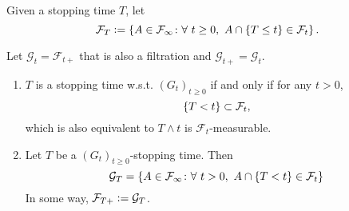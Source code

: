 \begin{defn}
    Given a stopping time $T$, let
    \begin{equation*}
        \mathcal{F}_T \vcentcolon= \left\{A \in \mathcal{F}_\infty \colon \forall~t \geq 0,~ A \cap \left\{T \leq t\right\} \in \mathcal{F}_t\right\}.
    \end{equation*}
\end{defn}

\noindent Let $\mathcal{G}_t = \mathcal{F}_{t+}$ that is also a filtration and $\mathcal{G}_{t+} = \mathcal{G}_t$.
\begin{prop}
    \begin{enumerate}[label=(\arabic{*})]
        \item $T$ is a stopping time w.s.t. $(G_t)_{t \geq 0}$ if and only if for any $t > 0$,
        \begin{equation*}
             \left\{T < t\right\} \subset \mathcal{F}_t,
        \end{equation*}
        which is also equivalent to $T \wedge t$ is $\mathcal{F}_t$-measurable.
        \item Let $T$ be a $(G_t)_{t \geq 0}$-stopping time. Then
        \begin{equation*}
            \mathcal{G}_T = \left\{A \in \mathcal{F}_\infty \colon \forall~t > 0,~A \cap \left\{T < t\right\} \in \mathcal{F}_t\right\}
        \end{equation*}
        In some way, $ \mathcal{F}_{T+} \vcentcolon= \mathcal{G}_T$.
    \end{enumerate} 
\end{prop}

